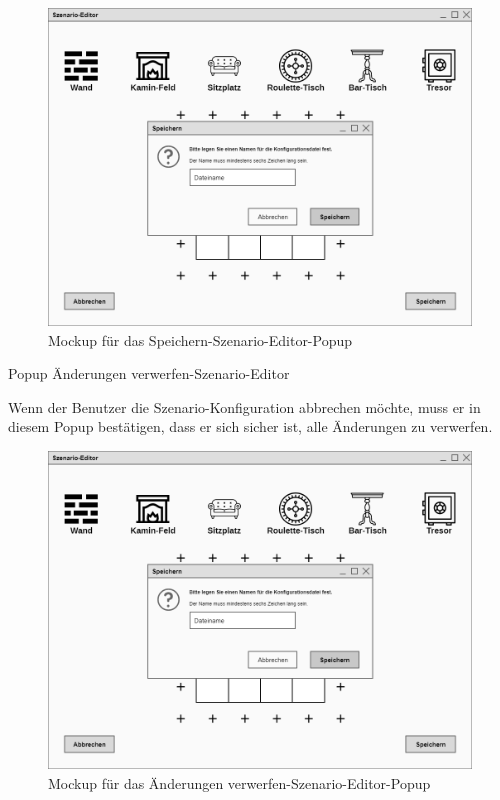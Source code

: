 \begin{figure}
  \centering
  \includegraphics[width=\textwidth]{Meilenstein03/Speichern-Szenario-Editor_Mockup.png}
  \caption{Mockup für das Speichern-Szenario-Editor-Popup}
\end{figure}

Popup \glqq{}Änderungen verwerfen-Szenario-Editor\grqq{}

Wenn der Benutzer die Szenario-Konfiguration abbrechen möchte, muss er in diesem Popup bestätigen, dass er sich sicher ist, alle Änderungen zu verwerfen.

\begin{figure}
  \centering
  \includegraphics[width=\textwidth]{Meilenstein03/Speichern-Szenario-Editor_Mockup.png}
  \caption{Mockup für das Änderungen verwerfen-Szenario-Editor-Popup}
\end{figure}


